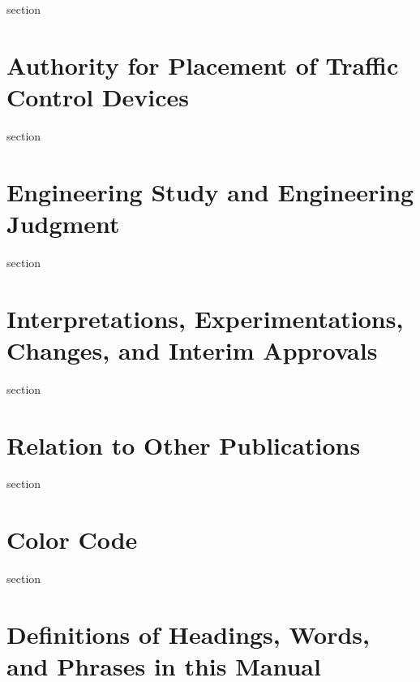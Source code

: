 \documentclass[9pt]{memoir}
\newif\ifshowstatus
\newcommand{\status}[1]{\ifshowstatus\section*{Status}\par#1\par\fi}
\begin{document}
section

\section{Authority for Placement of Traffic Control Devices}

section

\section{Engineering Study and Engineering Judgment}

section

\section{Interpretations, Experimentations, Changes, and Interim Approvals}

section

\section{Relation to Other Publications}
\label{sec:2009.1A.11}

section

\section{Color Code}

section

\section{Definitions of Headings, Words, and Phrases in this Manual}
\label{sec:2009.1A.13}
\status{Fill in remainder of this section.}
\end{document}
